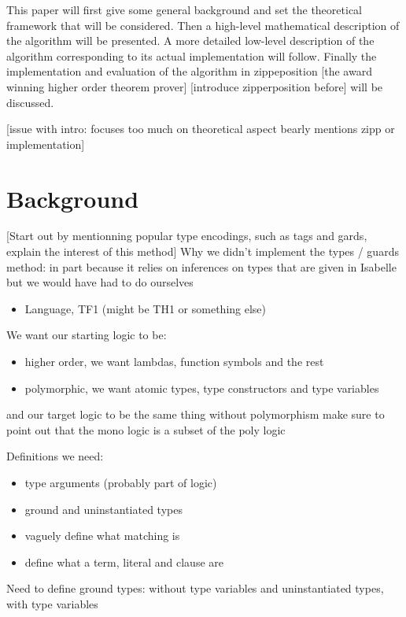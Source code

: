 \documentclass{article}
\begin{document}
\begin{itemize}
       This paper will first give some general background and set the theoretical framework that will be considered. Then a high-level mathematical description of the algorithm will be presented. A more detailed low-level description of the algorithm corresponding to its actual implementation will follow.
       Finally the implementation and evaluation of the algorithm in zippeposition [the award winning higher order theorem prover] [introduce zipperposition before] will be discussed.

       [issue with intro: focuses too much on theoretical aspect bearly mentions zipp or implementation]
\end{itemize}

\section{Background}

[Start out by mentionning popular type encodings, such as tags and gards, explain the interest of this method]
Why we didn't implement the types / guards method: in part because it relies on inferences on types that are given in Isabelle but we would have had to do ourselves

\begin{itemize}
    \item Language, TF1 (might be TH1 or something else)
\end{itemize}

We want our starting logic to be:
\begin{itemize}
    \item higher order, we want lambdas, function symbols and the rest
    \item polymorphic, we want atomic types, type constructors and type variables
\end{itemize}
and our target logic to be the same thing without polymorphism make sure to point out that the mono logic is a subset of the poly logic


Definitions we need:
\begin{itemize}
   \item type arguments (probably part of logic)
   \item ground and uninstantiated types 
   \item vaguely define what matching is
   \item define what a term, literal and clause are
\end{itemize}
Need to define ground types: without type variables and uninstantiated types, with type variables
\end{document}
